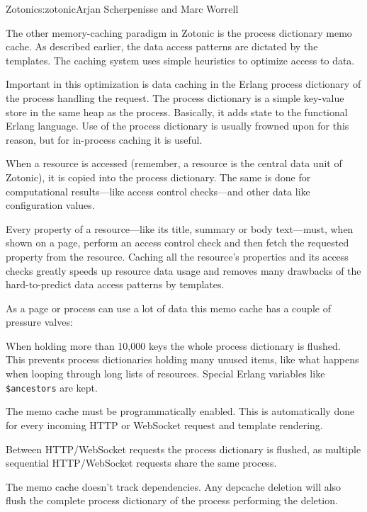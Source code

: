 \begin{aosachapter}{Zotonic}{s:zotonic}{Arjan Scherpenisse and Marc Worrell}

The other memory-caching paradigm in Zotonic is the process dictionary
memo cache. As described earlier, the data access patterns are dictated
by the templates. The caching system uses simple heuristics to optimize
access to data.

Important in this optimization is data caching in the Erlang process
dictionary of the process handling the request. The process dictionary
is a simple key-value store in the same heap as the process. Basically,
it adds state to the functional Erlang language. Use of the process
dictionary is usually frowned upon for this reason, but for in-process
caching it is useful.

When a resource is accessed (remember, a resource is the central data
unit of Zotonic), it is copied into the process dictionary. The same is
done for computational results---like access control checks---and other
data like configuration values.

Every property of a resource---like its title, summary or body
text---must, when shown on a page, perform an access control check and
then fetch the requested property from the resource. Caching all the
resource's properties and its access checks greatly speeds up resource
data usage and removes many drawbacks of the hard-to-predict data access
patterns by templates.

As a page or process can use a lot of data this memo cache has a couple
of pressure valves:

\begin{aosaenumerate}
\def\labelenumi{\arabic{enumi}.}

\item
  When holding more than 10,000 keys the whole process dictionary is
  flushed. This prevents process dictionaries holding many unused items,
  like what happens when looping through long lists of resources.
  Special Erlang variables like \texttt{\$ancestors} are kept.
\item
  The memo cache must be programmatically enabled. This is automatically
  done for every incoming HTTP or WebSocket request and template
  rendering.
\item
  Between HTTP/WebSocket requests the process dictionary is flushed, as
  multiple sequential HTTP/WebSocket requests share the same process.
\item
  The memo cache doesn't track dependencies. Any depcache deletion will
  also flush the complete process dictionary of the process performing
  the deletion.
\end{aosaenumerate}


\end{aosachapter}
